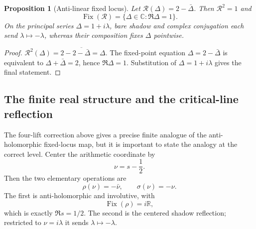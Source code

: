 \documentclass[11pt]{article}
\newtheorem{proposition}[theorem]{Proposition}
\theoremstyle{definition}\newtheorem{definition}[theorem]{Definition}
\theoremstyle{remark}\newtheorem{remark}[theorem]{Remark}\newtheorem{conjecture}[theorem]{Conjecture}
\begin{document}
\begin{proposition}[Anti-linear fixed locus]\label{prop:fixed}
Let $\mathcal R(\Delta)=2-\bar\Delta$. Then $\mathcal R^2=1$ and
\begin{equation}
 \operatorname{Fix}(\mathcal R)=\{\Delta\in\mathbb C:\Re\Delta=1\}.
\end{equation}
On the principal series $\Delta=1+i\lambda$, bare shadow and complex conjugation each send $\lambda\mapsto-\lambda$, whereas their composition fixes $\Delta$ pointwise.
\end{proposition}
\begin{proof}
$\mathcal R^2(\Delta)=2-\overline{2-\bar\Delta}=\Delta$. The fixed-point equation $\Delta=2-\bar\Delta$ is equivalent to $\Delta+\bar\Delta=2$, hence $\Re\Delta=1$. Substitution of $\Delta=1+i\lambda$ gives the final statement.
\end{proof}

\subsection{The finite real structure and the critical-line reflection}\label{subsec:finitecriticalreal}
The four-lift correction above gives a precise finite analogue of the anti-holomorphic fixed-locus map, but it is important to state the analogy at the correct level. Center the arithmetic coordinate by
\begin{equation}
 \nu=s-\frac12.
\end{equation}
Then the two elementary operations are
\begin{equation}\label{eq:centeredRHops}
 \rho(\nu)=-\bar\nu,
 \qquad
 \sigma(\nu)=-\nu.
\end{equation}
The first is anti-holomorphic and involutive, with
\begin{equation}
 \operatorname{Fix}(\rho)=i\mathbb R,
\end{equation}
which is exactly $\Re s=1/2$. The second is the centered shadow reflection; restricted to $\nu=i\lambda$ it sends $\lambda\mapsto-\lambda$.
\end{document}

